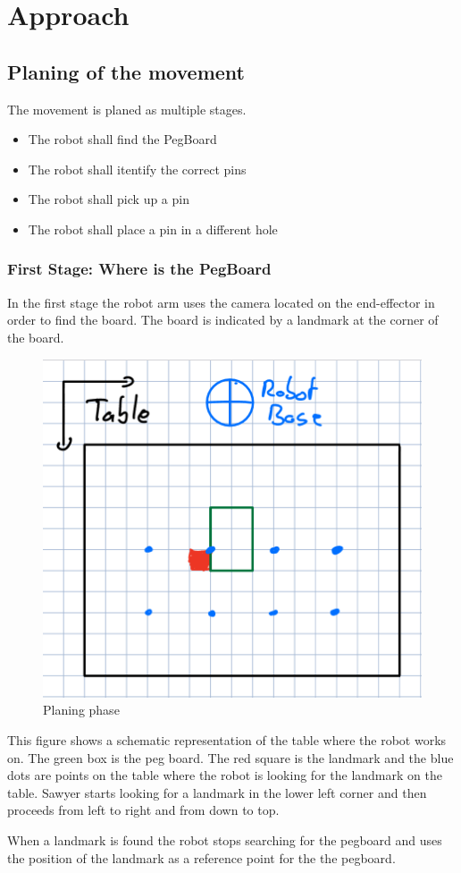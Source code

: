 \chapter{Approach}

\section{Planing of the movement}

The movement is planed as multiple stages.
\begin{itemize}
	\item The robot shall find the PegBoard
	\item The robot shall itentify the correct pins
	\item The robot shall pick up a pin
	\item The robot shall place a pin in a different hole
\end{itemize}

\subsection{First Stage: Where is the PegBoard}

In the first stage the robot arm uses the camera located on the end-effector in order to find the board.
The board is indicated by a landmark at the corner of the board.

\begin{figure}[H]
    \begin{center}
        \includegraphics[width=0.3\linewidth]{images/MovementStep1.png}
        \caption{Planing phase}
    \end{center}
\end{figure}

This figure shows a schematic representation of the table where the robot works on.
The green box is the peg board.
The red square is the landmark and the blue dots are points on the table
where the robot is looking for the landmark on the table.
Sawyer starts looking for a landmark in the lower left corner and then proceeds from left to right and from down to top.

When a landmark is found the robot stops searching for the pegboard
and uses the position of the landmark as a reference point for the the pegboard.
